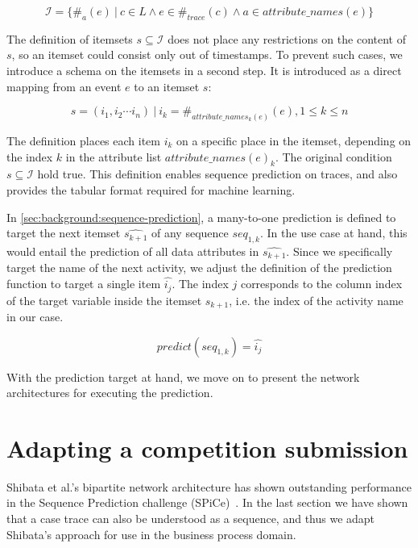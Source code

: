 $$\mathscr{I} = \{\#_{a}(e)\ |\ c \in L\wedge e \in \#_{trace}(c) \wedge a \in attribute\_names(e)\}$$

The definition of itemsets $s \subseteq \mathscr{I}$ does not place any restrictions on the content of $s$,
so an itemset could consist only out of timestamps.
To prevent such cases, we introduce a schema on the itemsets in a second step.
It is introduced as a direct mapping from an event $e$ to an itemset $s$:

$$ s = (i_1, i_2 \cdots i_n)\ |\ i_k = \#_{attribute\_names_k(e)}(e), 1 \leq k \leq n $$

The definition places each item $i_k$ on a specific place in the itemset, depending on the index $k$ in the attribute list $attribute\_names(e)_k$.
The original condition $s \subseteq \mathscr{I}$ hold true.
This definition enables sequence prediction on traces, and also provides the tabular format required for machine learning.

In \autoref{sec:background:sequence-prediction}, a many-to-one prediction is defined to target the next itemset $\widehat{s_{k+1}}$ of any sequence $seq_{1,k}$.
In the use case at hand, this would entail the prediction of all data attributes in $\widehat{s_{k+1}}$.
Since we specifically target the name of the next activity, we adjust the definition of the prediction function to target a single item $\hat{i_j}$.
The index $j$ corresponds to the column index of the target variable inside the itemset $s_{k+1}$, i.e. the index of the activity name in our case.

$$ predict(seq_{1,k}) = \hat{i_j} $$

With the prediction target at hand, we move on to present the network architectures for executing the prediction.

\section{Adapting a competition submission}\label{sec:contrib:sp2-inspiration}
Shibata et al.'s bipartite network architecture has shown outstanding performance in the Sequence Prediction challenge (SPiCe)~\cite{web:spice}.
In the last section we have shown that a case trace can also be understood as a sequence, and thus we adapt Shibata's approach for use in the business process domain.

